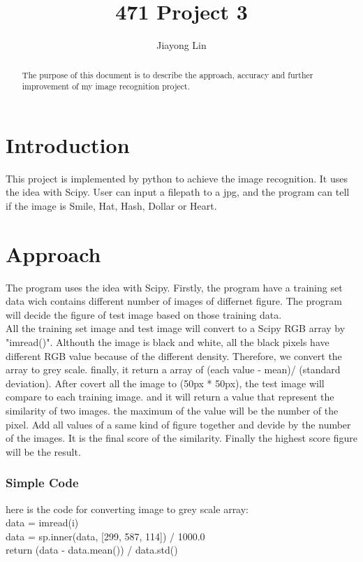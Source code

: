 \documentclass[a4paper]{article}
\title{471 Project 3}
\author{Jiayong Lin}
\begin{document}
\maketitle

\begin{abstract}
The purpose of this document is to describe the approach, accuracy and further improvement of my image recognition project.
\end{abstract}

\section{Introduction}

This project is implemented by python to achieve the image recognition. It uses the idea with Scipy. User can input a filepath to a jpg, and the program can tell if the image is Smile, Hat, Hash, Dollar or Heart. 

\section{Approach}
	The program uses the idea with Scipy. Firstly, the program have a training set data wich contains different number of images of differnet figure. The program will decide the figure of test image based on those training data. \\
	All the training set image and test image will convert to a Scipy RGB array by "imread()". Althouth the image is black and white, all the black pixels have different RGB value because of the different density. Therefore, we convert the array to grey scale. finally, it return a array of (each value - mean)/ (standard deviation). After covert all the image to (50px * 50px), the test image will compare to each training image. and it will return a value that represent the similarity of two images. the maximum of the value will be the number of the pixel. Add all values of a same kind of figure together and devide by the number of the images. It is the final score of the similarity. Finally the highest score figure will be the result.
\subsubsection{Simple Code}
    here is the code for converting image to grey scale array:\\
    data = imread(i)\\
    data = sp.inner(data, [299, 587, 114]) / 1000.0\\
    return (data - data.mean()) / data.std()\\
    \newpage
\end{document}
